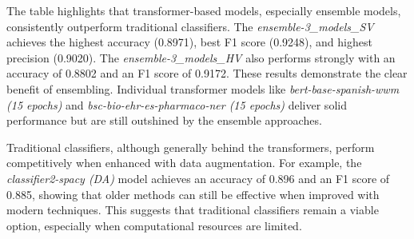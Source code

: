 \documentclass{Configuration_Files/PoliMi3i_thesis}
\begin{document}
The table highlights that transformer-based models, especially ensemble models, consistently outperform traditional classifiers. The \textit{ensemble-3\_models\_SV} achieves the highest accuracy (0.8971), best F1 score (0.9248), and highest precision (0.9020). The \textit{ensemble-3\_models\_HV} also performs strongly with an accuracy of 0.8802 and an F1 score of 0.9172. These results demonstrate the clear benefit of ensembling. Individual transformer models like \textit{bert-base-spanish-wwm (15 epochs)} and \textit{bsc-bio-ehr-es-pharmaco-ner (15 epochs)} deliver solid performance but are still outshined by the ensemble approaches. 

Traditional classifiers, although generally behind the transformers, perform competitively when enhanced with data augmentation. For example, the \textit{classifier2-spacy (DA)} model achieves an accuracy of 0.896 and an F1 score of 0.885, showing that older methods can still be effective when improved with modern techniques. This suggests that traditional classifiers remain a viable option, especially when computational resources are limited.
\end{document}
